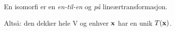 En isomorfi er en \emph{en-til-en} og \emph{på} lineærtransformasjon.

Altså: den dekker hele V og enhver $\mathbf{x}$ har en unik $T(\mathbf{x})$.
